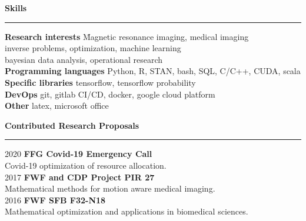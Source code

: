 \vspace{0.7cm}
{\bf Skills}\\
\noindent\rule{\textwidth}{0.5pt}
\begin{tabbing}
\textbf{Research interests} \quad \quad \quad \quad \quad \quad \= Magnetic resonance imaging, medical imaging\\ 
	\> inverse problems, optimization, machine learning\\
	\> bayesian data analysis, operational research\\
\textbf{Programming languages} \> Python, R, STAN, bash, SQL, C/C++, CUDA, scala\\
\textbf{Specific libraries} \> tensorflow, tensorflow probability\\
\textbf{DevOps} \> git, gitlab CI/CD, docker, google cloud platform\\
\textbf{Other} \> latex, microsoft office\\
\end{tabbing}
\bigskip

\vspace{0.7cm}
{\bf Contributed Research Proposals}\\
\noindent\rule{\textwidth}{0.5pt}
\begin{tabbing}
2020 \= \textbf{FFG Covid-19 Emergency Call}\\
  \> Covid-19 optimization of resource allocation. \\ 
2017  \= \textbf{FWF and CDP Project PIR 27} \\
  \> Mathematical methods for motion aware medical imaging. \\ 
2016  \= \textbf{FWF SFB F32-N18} \\ 
  \> Mathematical optimization and applications in biomedical sciences. \\ 
\end{tabbing}
\bigskip

